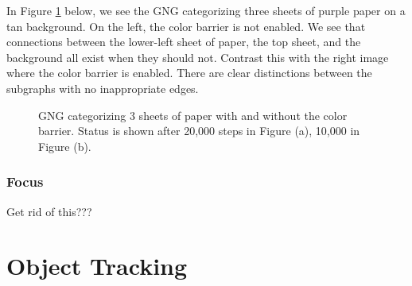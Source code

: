 \documentclass{article}
\renewcommand{\|}{\origbar} %
\begin{document}
In Figure \ref{fig:colorBarrier} below, we see the GNG categorizing three sheets of purple paper on a tan background. On the left, the color barrier is not enabled. We see that connections between the lower-left sheet of paper, the top sheet, and the background all exist when they should not. Contrast this with the right image where the color barrier is enabled. There are clear distinctions between the subgraphs with no inappropriate edges.

\begin{figure}[h!]
  \centering


  \caption{GNG categorizing 3 sheets of paper with and without the color barrier. Status is shown after 20,000 steps in Figure (a), 10,000 in Figure (b).}
  \label{fig:colorBarrier}
\end{figure}


\subsubsection{Focus}

Get rid of this???

\section{Object Tracking}
\label{sec:objectTracking}
\end{document}
